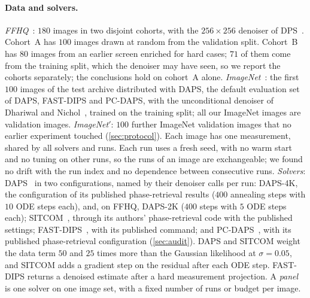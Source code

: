 \paragraph{Data and solvers.}
\emph{FFHQ}~\cite{karras2019stylegan}: $180$ images in two disjoint cohorts, with the $256\times256$ denoiser of DPS~\cite{chung2023dps}.
Cohort~A has $100$ images drawn at random from the validation split.
Cohort~B has $80$ images from an earlier screen enriched for hard cases; $71$ of them come from the training split, which the denoiser may have seen, so we report the cohorts separately; the conclusions hold on cohort~A alone.
\emph{ImageNet}~\cite{deng2009imagenet}: the first $100$ images of the test archive distributed with DAPS, the default evaluation set of DAPS, FAST-DIPS and PC-DAPS, with the unconditional denoiser of Dhariwal and Nichol~\cite{dhariwal2021diffusion}, trained on the training split; all our ImageNet images are validation images.
\emph{ImageNet$'$}: $100$ further ImageNet validation images that no earlier experiment touched (\cref{sec:protocol}).
Each image has one measurement, shared by all solvers and runs.
Each run uses a fresh seed, with no warm start and no tuning on other runs, so the runs of an image are exchangeable; we found no drift with the run index and no dependence between consecutive runs.
\emph{Solvers}: DAPS~\cite{zhang2025daps} in two configurations, named by their denoiser calls per run: DAPS-4K, the configuration of its published phase-retrieval results ($400$ annealing steps with $10$ ODE steps each), and, on FFHQ, DAPS-2K ($400$ steps with $5$ ODE steps each);
SITCOM~\cite{alkhouri2025sitcom}, through its authors' phase-retrieval code with the published settings;
FAST-DIPS~\cite{kim2026fastdips}, with its published command;
and PC-DAPS~\cite{kocabas2026pcdaps}, with its published phase-retrieval configuration (\cref{sec:audit}).
DAPS and SITCOM weight the data term $50$ and $25$ times more than the Gaussian likelihood at $\sigma=0.05$, and SITCOM adds a gradient step on the residual after each ODE step.
FAST-DIPS returns a denoised estimate after a hard measurement projection.
A \emph{panel} is one solver on one image set, with a fixed number of runs or budget per image.
